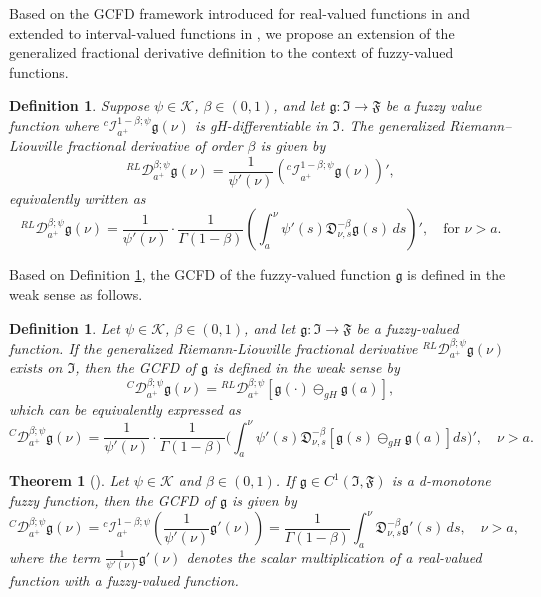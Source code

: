 \documentclass[10pt,a4paper]{amsart}
\numberwithin{equation}{section}
\newtheorem{theorem}[theo]{Theorem}
\newtheorem{definition}[theo]{Definition}
\begin{document}
Based on the GCFD framework introduced for real-valued functions in \cite{alm,bal} 
and extended to interval-valued functions in \cite{Fan}, we propose an extension of the 
generalized fractional derivative definition to the context of fuzzy-valued functions.

\begin{definition}\label{def3} \rm
Suppose \(\psi \in \mathcal{K}\), \(\beta \in (0,1)\), and let 
\(\mathfrak{g} : \mathfrak{I} \to \mathfrak{F}\) be a fuzzy value function where 
\({}^{c}\mathcal{I}_{a^{+}}^{1-\beta ; \psi} \mathfrak{g}(\nu )\) is gH-differentiable 
in \(\mathfrak{I}\). The generalized Riemann--Liouville fractional derivative of order 
\(\beta\) is given by
\[
{}^{RL} \mathcal{D}_{a^{+}}^{\beta ; \psi} \mathfrak{g}(\nu ) 
= \frac{1}{\psi'(\nu )} ( {}^{c} \mathcal{I}_{a^{+}}^{1-\beta ; \psi} \mathfrak{g}(\nu ) )',
\]
equivalently written as
\[
{}^{RL} \mathcal{D}_{a^{+}}^{\beta ; \psi} \mathfrak{g}(\nu )
 = \frac{1}{\psi'(\nu )} \cdot \frac{1}{\Gamma(1 - \beta)} ( \int_{a}^{\nu } \psi'(s) \mathfrak{D}_{\nu ,s}^{-\beta} \mathfrak{g}(s) \, ds )', \quad \text{for } \nu > a. \tag{2.5}
\]
\end{definition}

Based on Definition \ref{def3}, the GCFD of the fuzzy-valued function $\mathfrak{g}$ 
is defined in the weak sense as follows.


\begin{definition}\label{def4} \rm
Let \(\psi \in \mathcal{K}\), \(\beta \in (0,1)\), and let 
\(\mathfrak{g} : \mathfrak{I} \to \mathfrak{F}\) be a fuzzy-valued function. If the 
generalized Riemann-Liouville fractional derivative 
\({}^{RL} \mathcal{D}_{a^{+}}^{\beta ; \psi} \mathfrak{g}(\nu )\) exists on 
\(\mathfrak{I}\), then the GCFD of \(\mathfrak{g}\) is defined in the weak sense by
$$
{}^C \mathcal{D}_{a^{+}}^{\beta ; \psi} \mathfrak{g}(\nu ) 
= {}^{RL} \mathcal{D}_{a^{+}}^{\beta ; \psi} [ \mathfrak{g}(\cdot) \ominus_{gH} 
\mathfrak{g}(a) ],
$$
which can be equivalently expressed as
\[
{}^C \mathcal{D}_{a^{+}}^{\beta ; \psi} \mathfrak{g}(\nu ) 
= \frac{1}{\psi'(\nu )} \cdot \frac{1}{\Gamma(1 - \beta)} 
\Big( \int_{a}^{\nu } \psi'(s) \mathfrak{D}_{\nu ,s}^{-\beta} [ \mathfrak{g}(s)
 \ominus_{gH} \mathfrak{g}(a) ] ds \Big)', \quad \nu > a. \tag{2.6}
\]
\end{definition}

\begin{theorem}[\cite{hoa2018}] \label{thm2.1}
Let \(\psi \in \mathcal{K}\) and \(\beta \in (0,1)\). 
If \(\mathfrak{g} \in C^1(\mathfrak{I}, \mathfrak{F})\) is a d-monotone fuzzy function, 
then the GCFD of \(\mathfrak{g}\) is given by
\begin{equation}
\label{e2.7}
{}^C \mathcal{D}_{a^{+}}^{\beta ; \psi} \mathfrak{g}(\nu )
= {}^{c} \mathcal{I}_{a^{+}}^{1-\beta ; \psi} ( \frac{1}{\psi'(\nu )}
\mathfrak{g}'(\nu ) ) = \frac{1}{\Gamma(1 - \beta)} \int_{a}^{\nu }
\mathfrak{D}_{\nu ,s}^{-\beta} \mathfrak{g}'(s) \, ds, \quad \nu > a,
\end{equation}
where the term \(\frac{1}{\psi'(\nu )} \mathfrak{g}'(\nu )\) denotes the scalar
multiplication of a real-valued function with a fuzzy-valued function.
\end{theorem}
\end{document}
